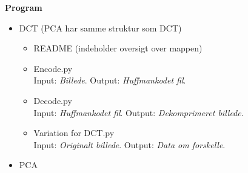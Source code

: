 \textbf{Program}
\begin{itemize}
\item DCT (PCA har samme struktur som DCT)
	\begin{itemize}
	\item README (indeholder oversigt over mappen)
	\item Encode.py \\
	Input: \textit{Billede}. Output: \textit{Huffmankodet fil}.
	
	\item Decode.py	 \\
	Input: \textit{Huffmankodet fil}. Output: \textit{Dekomprimeret billede}.
	
	\item Variation for DCT.py\\
	Input: \textit{Originalt billede}. Output: \textit{Data om forskelle}.
	\end{itemize}
\item PCA
%	
\end{itemize}


